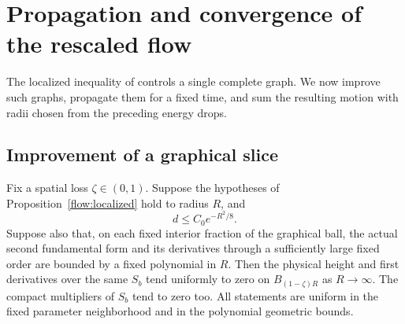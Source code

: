 \section{Propagation and convergence of the rescaled flow}\label{sec:flow}

The localized inequality of  controls a single complete graph.  We now improve such graphs, propagate them for a fixed time, and sum the resulting motion with radii chosen from the preceding energy drops.

\subsection{Improvement of a graphical slice}

\begin{lemma}\label{flow:improvement}
Fix a spatial loss $\zeta\in(0,1)$.  Suppose the hypotheses of
Proposition~\ref{flow:localized} hold to radius $R$, and
\begin{equation}\label{flow:small-speed}
 d\le C_0e^{-R^2/8}.
\end{equation}
Suppose also that, on each fixed interior fraction of the graphical
ball, the actual second fundamental form and its derivatives through
a sufficiently large fixed order are bounded by a fixed polynomial
in $R$.  Then the physical height and first derivatives over the
same $S_b$ tend uniformly to zero on $B_{(1-\zeta)R}$ as
$R\longrightarrow\infty$.  The compact multipliers of $S_b$ tend
to zero too.  All statements are uniform in the fixed parameter
neighborhood and in the polynomial geometric bounds.
\end{lemma}

